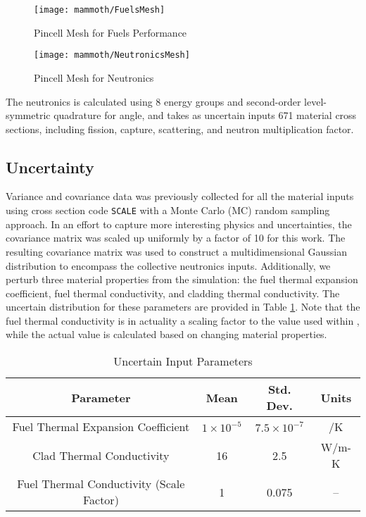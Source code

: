 \begin{figure}[H]
  \centering
  \texttt{[image: mammoth/FuelsMesh]}
  \caption{Pincell Mesh for Fuels Performance \cite{physormammoth}}
  \label{fig:pincell fuel mesh}
\end{figure}
\begin{figure}[H]
  \centering
  \texttt{[image: mammoth/NeutronicsMesh]}
  \caption{Pincell Mesh for Neutronics \cite{physormammoth}}
  \label{fig:pincell neutron mesh}
\end{figure}

The neutronics is calculated using 8 energy groups and second-order level-symmetric quadrature for angle, and 
takes as uncertain inputs 671 material cross
sections, including fission, capture, scattering, and neutron multiplication factor.  

\subsection{Uncertainty}
Variance and covariance
data was previously collected for all the material inputs using cross section code \texttt{SCALE} \cite{scale}
with a Monte Carlo (MC)
random sampling approach.  In an effort to capture more interesting physics and uncertainties, the covariance
matrix was scaled up uniformly by a factor of 10 for this work.  The resulting covariance matrix was used to
construct a multidimensional Gaussian distribution to encompass the collective neutronics inputs.
Additionally, we perturb three material properties from
the \bison{} simulation: the fuel thermal expansion coefficient, fuel thermal conductivity, and cladding
thermal conductivity.  The uncertain distribution for these parameters are provided in Table 
\ref{tab:pincell bison distros}.  Note that the fuel thermal conductivity is in actuality a scaling factor to
the value used within \bison{}, while the actual value is calculated based on changing material properties.
\begin{table}
  \centering
  \begin{tabular}{c|c c|c}
    Parameter & Mean & Std. Dev. & Units \\ \hline
    Fuel Thermal Expansion Coefficient & $1\times10^{-5}$ & $7.5\times10^{-7}$ & /K\\
    Clad Thermal Conductivity & 16 & 2.5 & W/m-K\\
    Fuel Thermal Conductivity (Scale Factor) & 1 & 0.075 & --
  \end{tabular}
  \caption{\bison{} Uncertain Input Parameters}
  \label{tab:pincell bison distros}
\end{table}

